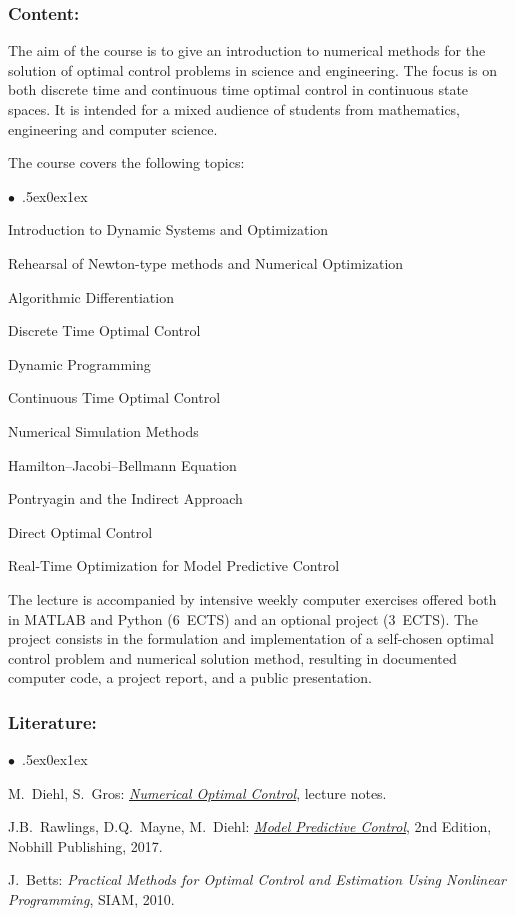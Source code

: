 \documentclass[a4paper,10pt]{article}
\renewenvironment{itemize}{\begin{list}{$\bullet$\ }{\itemsep.5ex\setlength{\topsep}{0.5\itemsep}\parsep0ex\labelsep1ex\settowidth{\labelwidth}{$\bullet$\ }\setlength{\leftmargin}{\labelwidth}\addtolength{\leftmargin}{3ex}\addtolength{\leftmargin}{\labelsep}}}{\end{list}}
\begin{document}
\subsubsection*{\large
    Content:
}
The aim of the course is to give an introduction to numerical methods for the solution of optimal control problems in science and engineering. The focus is on both discrete time and continuous time optimal control in continuous state spaces. It is intended for a mixed audience of students from mathematics, engineering and computer science.

The course covers the following topics:
\begin{itemize}
\item Introduction to Dynamic Systems and Optimization
\item  Rehearsal of Newton-type methods and Numerical Optimization
\item  Algorithmic Differentiation
\item  Discrete Time Optimal Control
\item  Dynamic Programming
\item  Continuous Time Optimal Control
\item  Numerical Simulation Methods
\item  Hamilton–Jacobi–Bellmann Equation
\item  Pontryagin and the Indirect Approach
\item  Direct Optimal Control
\item  Real-Time Optimization for Model Predictive Control
\end{itemize}

The lecture is accompanied by intensive weekly computer exercises offered both in MATLAB and Python (6~ECTS) and an optional project (3~ECTS). The project consists in the formulation and implementation of a self-chosen optimal control problem and numerical solution method, resulting in documented computer code, a project report, and a public presentation.
\subsubsection*{\large
    Literature:
}
\begin{itemize}
\item
 M.~Diehl, S.~Gros: \href{https://www.syscop.de/files/2020ss/NOC/book-NOCSE.pdf}{\emph{Numerical Optimal Control}}, lecture notes. 
\item
J.B.~Rawlings, D.Q.~Mayne, M.~Diehl: \href{https://sites.engineering.ucsb.edu/\~jbraw/mpc/MPC-book-2nd-edition-4th-printing.pdf}{\emph{Model Predictive Control}}, 2nd Edition, Nobhill Publishing, 2017.
\item
J.~Betts: \emph{Practical Methods for Optimal Control and Estimation Using Nonlinear Programming}, SIAM, 2010.
\end{itemize}
\end{document}

